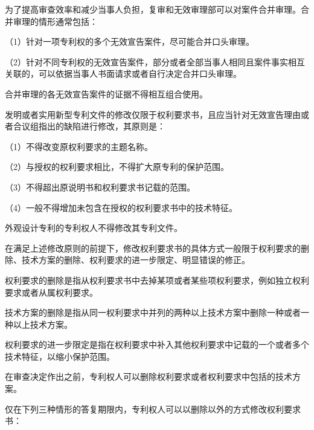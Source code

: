 为了提高审查效率和减少当事人负担，复审和无效审理部可以对案件合并审理。合并审理的情形通常包括：

{\setlength{\parindent}{17.1bp}（1）针对一项专利权的多个无效宣告案件，尽可能合并口头审理。\par}

{\setlength{\parindent}{17.1bp}（2）针对不同专利权的无效宣告案件，部分或者全部当事人相同且案件事实相互关联的，可以依据当事人书面请求或者自行决定合并口头审理。\par}

合并审理的各无效宣告案件的证据不得相互组合使用。

发明或者实用新型专利文件的修改仅限于权利要求书，且应当针对无效宣告理由或者合议组指出的缺陷进行修改，其原则是：

{\setlength{\parindent}{17.1bp}（1）不得改变原权利要求的主题名称。\par}

{\setlength{\parindent}{17.1bp}（2）与授权的权利要求相比，不得扩大原专利的保护范围。\par}

{\setlength{\parindent}{17.1bp}（3）不得超出原说明书和权利要求书记载的范围。\par}

{\setlength{\parindent}{17.1bp}（4）一般不得增加未包含在授权的权利要求书中的技术特征。\par}

外观设计专利的专利权人不得修改其专利文件。

在满足上述修改原则的前提下，修改权利要求书的具体方式一般限于权利要求的删除、技术方案的删除、权利要求的进一步限定、明显错误的修正。

权利要求的删除是指从权利要求书中去掉某项或者某些项权利要求，例如独立权利要求或者从属权利要求。

技术方案的删除是指从同一权利要求中并列的两种以上技术方案中删除一种或者一种以上技术方案。

权利要求的进一步限定是指在权利要求中补入其他权利要求中记载的一个或者多个技术特征，以缩小保护范围。

在审查决定作出之前，专利权人可以删除权利要求或者权利要求中包括的技术方案。

仅在下列三种情形的答复期限内，专利权人可以以删除以外的方式修改权利要求书：

